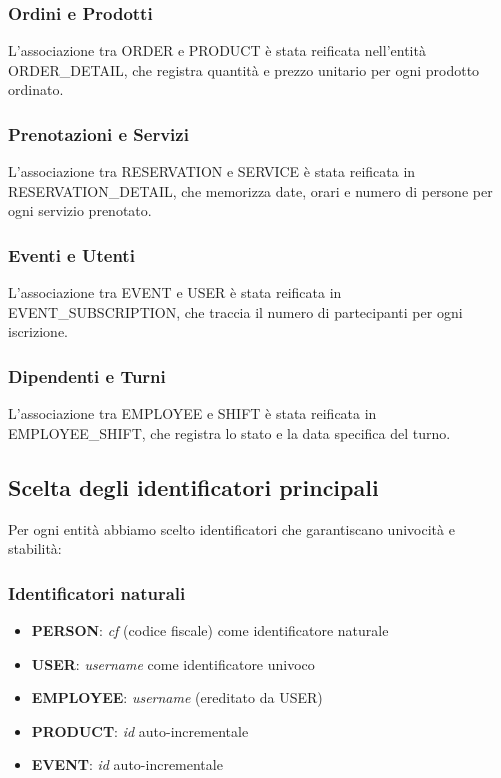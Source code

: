 \documentclass[a4paper,12pt]{report}
\begin{document}
\subsubsection{Ordini e Prodotti}

L'associazione tra ORDER e PRODUCT è stata reificata nell'entità ORDER\_DETAIL, che registra quantità e prezzo unitario per ogni prodotto ordinato.

\subsubsection{Prenotazioni e Servizi}

L'associazione tra RESERVATION e SERVICE è stata reificata in RESERVATION\_DETAIL, che memorizza date, orari e numero di persone per ogni servizio prenotato.

\subsubsection{Eventi e Utenti}

L'associazione tra EVENT e USER è stata reificata in EVENT\_SUBSCRIPTION, che traccia il numero di partecipanti per ogni iscrizione.

\subsubsection{Dipendenti e Turni}

L'associazione tra EMPLOYEE e SHIFT è stata reificata in EMPLOYEE\_SHIFT, che registra lo stato e la data specifica del turno.

\subsection{Scelta degli identificatori principali}

Per ogni entità abbiamo scelto identificatori che garantiscano univocità e stabilità:

\subsubsection{Identificatori naturali}

\begin{itemize}
    \item \textbf{PERSON}: \textit{cf} (codice fiscale) come identificatore naturale
    \item \textbf{USER}: \textit{username} come identificatore univoco
    \item \textbf{EMPLOYEE}: \textit{username} (ereditato da USER)
    \item \textbf{PRODUCT}: \textit{id} auto-incrementale
    \item \textbf{EVENT}: \textit{id} auto-incrementale
\end{itemize}
\end{document}
